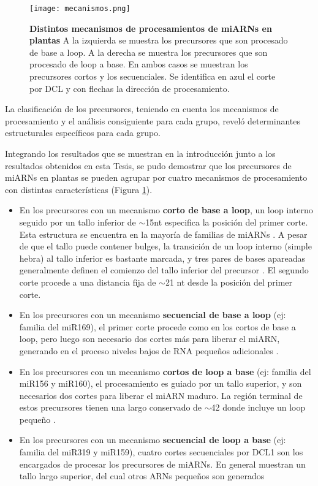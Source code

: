 \begin{figure}[htbp!] 
    \centering    
    \texttt{[image: mecanismos.png]}
    \caption[Mecanismos de procesamiento]{
    \textbf{Distintos mecanismos de procesamientos de miARNs en plantas}
    A la izquierda se muestra los precursores que son procesado de base a loop.
    A la derecha se muestra los precursores que son procesado de loop a base.
    En ambos casos se muestran los precursores cortos y los secuenciales.
    Se identifica en azul el corte por DCL y con flechas la dirección de procesamiento.
        }
    \label{fig:mecanismos}
\end{figure}

La clasificación de los precursores, teniendo en cuenta los mecanismos de procesamiento y el análisis consiguiente para cada grupo, reveló determinantes estructurales específicos para cada grupo.

Integrando los resultados que se muestran en la introducción junto a los resultados obtenidos en esta Tesis, se pudo demostrar que los precursores de miARNs en plantas se pueden agrupar por cuatro mecanismos de procesamiento con distintas características (Figura \ref{fig:mecanismos}).

\begin{itemize}
    \item En los precursores con un mecanismo \textbf{corto de base a loop}, un loop interno seguido por un tallo inferior de $\sim$15nt especifica la posición del primer corte.
        Esta estructura se encuentra en la mayoría de familias de miARNs \citep{Mateos2010,pmid20015653,pmid20015654}.
        A pesar de que el tallo puede contener bulges, la transición de un loop interno (simple hebra) al tallo inferior es bastante marcada, y tres pares de bases apareadas generalmente definen el comienzo del tallo inferior del precursor \citep{Bologna2013}.
        El segundo corte procede a una distancia fija de $\sim$21 nt desde la posición del primer corte.
    \item En los precursores con un mecanismo \textbf{secuencial de base a loop} (ej: familia del miR169), el primer corte procede como en los cortos de base a loop, pero luego son necesario dos cortes más para liberar el miARN, generando en el proceso niveles bajos de RNA pequeños adicionales \citep{Bologna2013}.
    \item En los precursores con un mecanismo \textbf{cortos de loop a base} (ej: familia del miR156 y miR160), el procesamiento es guiado por un tallo superior, y son necesarios dos cortes para liberar el miARN maduro.
        La región terminal de estos precursores tienen una largo conservado de $\sim$42 donde incluye un loop pequeño \citep{Bologna2013}.
    \item En los precursores con un mecanismo \textbf{secuencial de loop a base} (ej: familia del miR319 y miR159), cuatro cortes secuenciales por DCL1 son los encargados de procesar los precursores de miARNs.
        En general muestran un tallo largo superior, del cual otros ARNs pequeños son generados \citep{pmid19850910,Bologna2009,Bologna2013}
\end{itemize}



